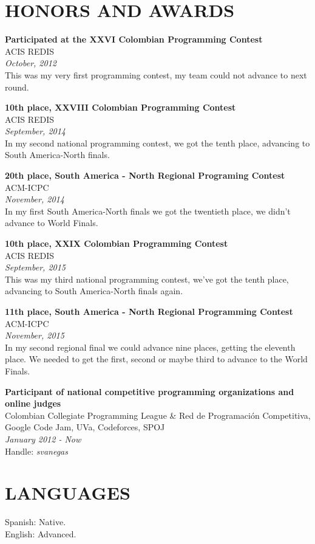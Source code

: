 \documentclass[margin, 10pt]{res} %
\begin{document}
\begin{resume}
\section{HONORS AND AWARDS}

\textbf{Participated at the XXVI Colombian Programming Contest} \\
ACIS REDIS \\
\textit{October, 2012} \\
This was my very first programming contest, my team could not advance to next round.

\textbf{10th place, XXVIII Colombian Programming Contest} \\
ACIS REDIS \\
\textit{September, 2014} \\
In my second national programming contest, we got the tenth place, advancing to South America-North
finals.

\textbf{20th place, South America - North Regional Programing Contest} \\
ACM-ICPC \\
\textit{November, 2014} \\
In my first South America-North finals we got the twentieth place, we didn't advance to World
Finals.

\textbf{10th place, XXIX Colombian Programming Contest} \\
ACIS REDIS \\
\textit{September, 2015} \\
This was my third national programming contest, we've got the tenth place, advancing to South
America-North finals again.

\textbf{11th place, South America - North Regional Programming Contest} \\
ACM-ICPC \\
\textit{November, 2015} \\
In my second regional final we could advance nine places, getting the eleventh place.
We needed to get the first, second or maybe third to advance to the World Finals.

\textbf{Participant of national competitive programming organizations and online judges} \\
Colombian Collegiate Programming League \& Red de Programación Competitiva, Google Code Jam, UVa,
Codeforces, SPOJ \\
\textit{January 2012 - Now} \\
Handle: {\sl svanegas}


\section{LANGUAGES}
Spanish: Native. \\
English: Advanced.

\end{resume}
\end{document}
